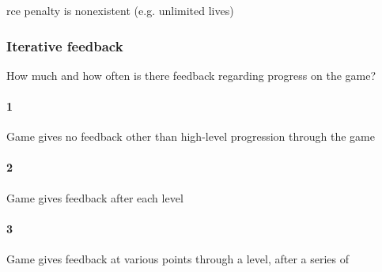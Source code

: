 rce penalty is nonexistent (e.g. unlimited lives)\subsubsection{Iterative feedback}How much and how often is there feedback regarding progress on the game?\paragraph{1}Game gives no feedback other than high-level progression through the game\paragraph{2}Game gives feedback after each level\paragraph{3}Game gives feedback at various points through a level, after a series of 